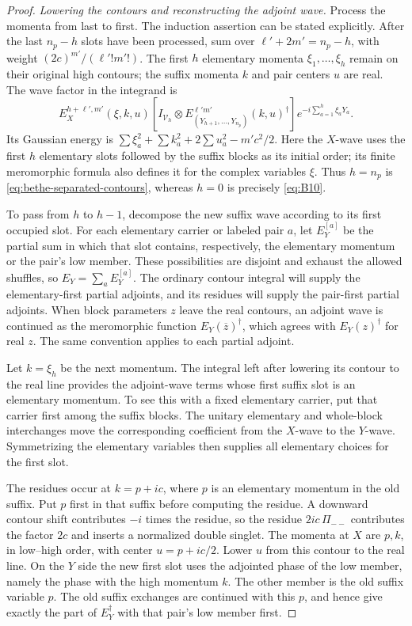 \begin{proof}
\emph{Lowering the contours and reconstructing the adjoint wave.}
Process the momenta from last to first.  The induction assertion can be
stated explicitly.  After the last \(n_p-h\) slots have been processed,
sum over \(\ell'+2m'=n_p-h\), with weight
\((2c)^{m'}/(\ell'!m'!)\).  The first \(h\) elementary momenta
\(\xi_1,\ldots,\xi_h\) remain on their original high contours; the
suffix momenta \(k\) and pair centers \(u\) are real.  The wave factor
in the integrand is
\[
 E_X^{h+\ell',m'}(\xi,k,u)
 \left[I_{\mathcal V_h}\otimes
       E_{(Y_{h+1},\ldots,Y_{n_p})}^{\ell'm'}(k,u)^\dagger\right]
 e^{-i\sum_{a=1}^h\xi_aY_a}.
\]
Its Gaussian energy is
\(\sum\xi_a^2+\sum k_a^2+2\sum u_a^2-m'c^2/2\).
Here the \(X\)-wave uses the first \(h\) elementary slots followed by
the suffix blocks as its initial order; its finite meromorphic formula
also defines it for the complex variables \(\xi\).  Thus \(h=n_p\)
is \eqref{eq:bethe-separated-contours}, whereas \(h=0\) is precisely
\eqref{eq:B10}.

To pass from \(h\) to \(h-1\), decompose the new suffix wave according
to its first occupied slot.  For each elementary carrier or labeled pair
\(a\), let \(E_Y^{[a]}\) be the partial sum in which that slot contains,
respectively, the elementary momentum or the pair's low member.  These
possibilities are disjoint and exhaust the allowed shuffles, so
\(E_Y=\sum_a E_Y^{[a]}\).  The ordinary contour integral will supply
the elementary-first partial adjoints, and its residues will supply the
pair-first partial adjoints.
When block parameters \(z\) leave the real contours, an adjoint wave is
continued as the meromorphic function \(E_Y(\overline z)^\dagger\),
which agrees with \(E_Y(z)^\dagger\) for real \(z\).  The same convention
applies to each partial adjoint.

Let \(k=\xi_h\) be the next momentum.  The integral left after lowering
its contour to the real line provides the adjoint-wave terms whose
first suffix slot is an elementary momentum.  To see this with a
fixed elementary carrier, put that carrier first among the suffix
blocks.  The unitary elementary and whole-block interchanges move
the corresponding coefficient from the \(X\)-wave to the
\(Y\)-wave.  Symmetrizing the elementary variables then supplies
all elementary choices for the first slot.

The residues occur at \(k=p+ic\), where \(p\) is an elementary
momentum in the old suffix.  Put \(p\) first in that suffix before
computing the residue.  A downward contour shift contributes
\(-i\) times the residue, so the residue \(2ic\,\Pi_{--}\) contributes
the factor \(2c\) and inserts a normalized double singlet.
The momenta at \(X\) are \(p,k\), in low--high order, with center
\(u=p+ic/2\).  Lower \(u\) from this contour to the real line.
On the \(Y\) side the new first slot uses the adjointed phase of
the low member, namely the phase with the high momentum \(k\).
The other member is the old suffix variable \(p\).  The old
suffix exchanges are continued with this \(p\), and hence give
exactly the part of \(E_Y^\dagger\) with that pair's low member
first.


\end{proof}
